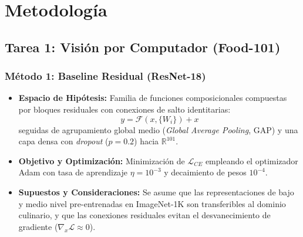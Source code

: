 \documentclass[conference]{IEEEtran}
\begin{document}
\section{Metodología}

\subsection{Tarea 1: Visión por Computador (Food-101)}
\subsubsection{Método 1: Baseline Residual (ResNet-18)}
\begin{itemize}
    \item \textbf{Espacio de Hipótesis:} Familia de funciones composicionales compuestas por bloques residuales con conexiones de salto identitarias:
    \begin{equation}
    y = \mathcal{F}(x, \{W_i\}) + x
    \end{equation}
    seguidas de agrupamiento global medio (\textit{Global Average Pooling}, GAP) y una capa densa con \textit{dropout} ($p=0.2$) hacia $\mathbb{R}^{101}$.
    \item \textbf{Objetivo y Optimización:} Minimización de $\mathcal{L}_{CE}$ empleando el optimizador Adam con tasa de aprendizaje $\eta = 10^{-3}$ y decaimiento de pesos $10^{-4}$.
    \item \textbf{Supuestos y Consideraciones:} Se asume que las representaciones de bajo y medio nivel pre-entrenadas en ImageNet-1K son transferibles al dominio culinario, y que las conexiones residuales evitan el desvanecimiento de gradiente ($\nabla_x \mathcal{L} \approx 0$).
\end{itemize}
\end{document}
